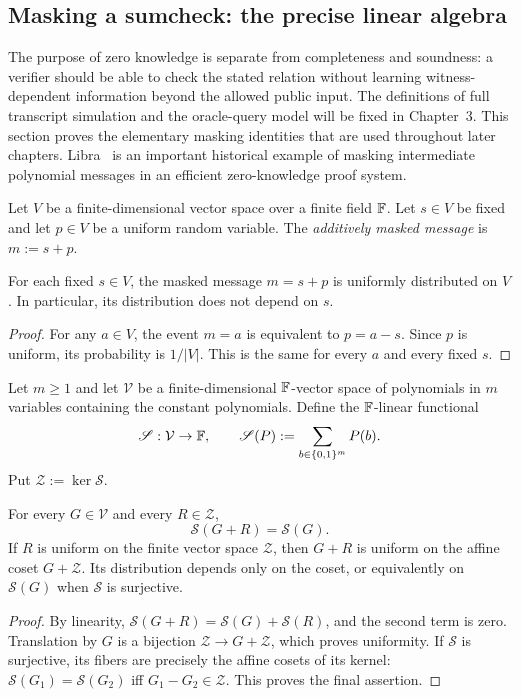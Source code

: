 \subsection{Masking a sumcheck: the precise linear algebra}\label{sec:history:masking}

The purpose of zero knowledge is separate from completeness and soundness: a verifier should be able to check the stated relation without learning witness-dependent information beyond the allowed public input. The definitions of full transcript simulation and the oracle-query model will be fixed in Chapter~3. This section proves the elementary masking identities that are used throughout later chapters. Libra~\cite{XieEtAl2019Libra} is an important historical example of masking intermediate polynomial messages in an efficient zero-knowledge proof system.

\begin{definition}\label{def:history:pad}
Let $V$ be a finite-dimensional vector space over a finite field $\mathbb{F}$. Let $s\in V$ be fixed and let $p\in V$ be a uniform random variable. The \emph{additively masked message} is $m:=s+p$.
\end{definition}

\begin{lemma}\label{lem:history:otp}
For each fixed $s\in V$, the masked message $m=s+p$ is uniformly distributed on $V$. In particular, its distribution does not depend on $s$.
\end{lemma}
\begin{proof}
For any $a\in V$, the event $m=a$ is equivalent to $p=a-s$. Since $p$ is uniform, its probability is $1/|V|$. This is the same for every $a$ and every fixed $s$.
\end{proof}

\begin{definition}\label{def:history:sumfunctional}
Let $m\geq1$ and let $\mathcal V$ be a finite-dimensional $\mathbb{F}$-vector space of polynomials in $m$ variables containing the constant polynomials. Define the $\mathbb{F}$-linear functional
\[
 \mathscr S:\mathcal V\to\mathbb{F},\qquad
 \mathscr S(P):=\sum_{b\in\{0,1\}^m}P(b).
\]
Put $\mathcal Z:=\ker \mathscr S$.
\end{definition}

\begin{lemma}\label{lem:history:zerosum}
For every $G\in\mathcal V$ and every $R\in\mathcal Z$,
\[
 \mathscr S(G+R)=\mathscr S(G).
\]
If $R$ is uniform on the finite vector space $\mathcal Z$, then $G+R$ is uniform on the affine coset $G+\mathcal Z$. Its distribution depends only on the coset, or equivalently on $\mathscr S(G)$ when $\mathscr S$ is surjective.
\end{lemma}
\begin{proof}
By linearity, $\mathscr S(G+R)=\mathscr S(G)+\mathscr S(R)$, and the second term is zero. Translation by $G$ is a bijection $\mathcal Z\to G+\mathcal Z$, which proves uniformity. If $\mathscr S$ is surjective, its fibers are precisely the affine cosets of its kernel: $\mathscr S(G_1)=\mathscr S(G_2)$ iff $G_1-G_2\in\mathcal Z$. This proves the final assertion.
\end{proof}

